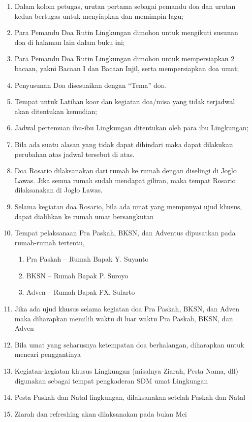 \begin{enumerate}
\item Dalam kolom petugas,   urutan pertama sebagai pemandu doa dan urutan
kedua bertugas untuk menyiapkan dan memimpin lagu; 
\item Para Pemandu Doa Rutin Lingkungan dimohon untuk mengikuti susunan
doa di halaman lain dalam buku ini; 
\item Para Pemandu Doa Rutin Lingkungan dimohon untuk mempersiapkan 2
bacaan,   yakni Bacaan I dan Bacaan Injil,   serta mempersiapkan doa umat; 
\item Penyusunan Doa disesuaikan dengan
{\textquotedblleft}Tema{\textquotedblright} doa. 
\item Tempat untuk Latihan koor dan kegiatan doa/misa yang tidak
terjadwal akan ditentukan kemudian; 
\item Jadwal pertemuan ibu-ibu Lingkungan ditentukan oleh para ibu
Lingkungan; 
\item Bila ada suatu alasan yang tidak dapat dihindari maka dapat
dilakukan perubahan atas jadwal tersebut di atas. 
\item Doa Rosario dilaksanakan dari rumah ke rumah dengan diselingi di Joglo Lawas. Jika semua rumah sudah mendapat giliran,   maka tempat Rosario dilaksanakan di Joglo Lawas.
\item Selama kegiatan doa Rosario,   bila ada umat yang mempunyai ujud khusus,   dapat dialihkan ke rumah umat bersangkutan
\item Tempat pelaksanaan Pra Paskah,   BKSN,   dan Adventus dipusatkan pada rumah-rumah tertentu,  
\begin{enumerate}
\item Pra Paskah -- Rumah Bapak Y. Suyanto
\item BKSN -- Rumah Bapak P. Suroyo
\item Adven -- Rumah Bapak FX. Sularto
\end{enumerate}

\item Jika ada ujud khusus selama kegiatan doa Pra Paskah,   BKSN,   dan Adven maka diharapkan memilih waktu di luar waktu Pra Paskah,   BKSN,   dan Adven
\item Bila umat yang seharusnya ketempatan doa berhalangan,   diharapkan untuk
mencari penggantinya
\item Kegiatan-kegiatan khusus Lingkungan (misalnya Ziarah,   Pesta Nama,   dll) digunakan sebagai tempat pengkaderan SDM umat Lingkungan 
\item Pesta Paskah dan Natal lingkungan,   dilaksanakan setelah Paskah dan Natal
\item Ziarah dan refreshing akan dilaksanakan pada bulan Mei
\end{enumerate}
